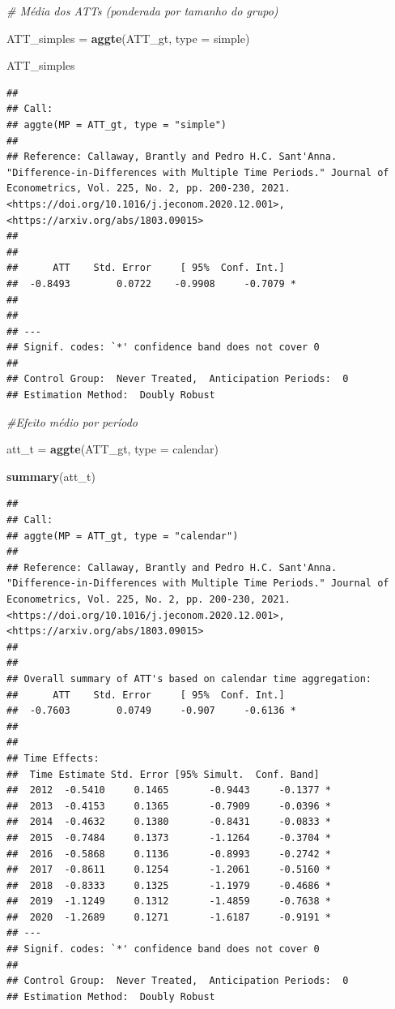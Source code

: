 \documentclass[
]{article}
\newenvironment{Shaded}{\begin{snugshade}}{\end{snugshade}}
\newcommand{\AttributeTok}[1]{\textcolor[rgb]{0.13,0.29,0.53}{#1}}
\newcommand{\CommentTok}[1]{\textcolor[rgb]{0.56,0.35,0.01}{\textit{#1}}}
\newcommand{\FunctionTok}[1]{\textcolor[rgb]{0.13,0.29,0.53}{\textbf{#1}}}
\newcommand{\NormalTok}[1]{#1}
\newcommand{\OtherTok}[1]{\textcolor[rgb]{0.56,0.35,0.01}{#1}}
\newcommand{\StringTok}[1]{\textcolor[rgb]{0.31,0.60,0.02}{#1}}
\begin{document}
\begin{Shaded}
\begin{Highlighting}[]
\CommentTok{\# Média dos ATTs (ponderada por tamanho do grupo)}

\NormalTok{ATT\_simples }\OtherTok{=} \FunctionTok{aggte}\NormalTok{(ATT\_gt, }\AttributeTok{type =} \StringTok{\textquotesingle{}simple\textquotesingle{}}\NormalTok{)}

\NormalTok{ATT\_simples}
\end{Highlighting}
\end{Shaded}

\begin{verbatim}
## 
## Call:
## aggte(MP = ATT_gt, type = "simple")
## 
## Reference: Callaway, Brantly and Pedro H.C. Sant'Anna.  "Difference-in-Differences with Multiple Time Periods." Journal of Econometrics, Vol. 225, No. 2, pp. 200-230, 2021. <https://doi.org/10.1016/j.jeconom.2020.12.001>, <https://arxiv.org/abs/1803.09015> 
## 
## 
##      ATT    Std. Error     [ 95%  Conf. Int.]  
##  -0.8493        0.0722    -0.9908     -0.7079 *
## 
## 
## ---
## Signif. codes: `*' confidence band does not cover 0
## 
## Control Group:  Never Treated,  Anticipation Periods:  0
## Estimation Method:  Doubly Robust
\end{verbatim}

\begin{Shaded}
\begin{Highlighting}[]
\CommentTok{\#Efeito médio por período}

\NormalTok{att\_t }\OtherTok{=} \FunctionTok{aggte}\NormalTok{(ATT\_gt, }\AttributeTok{type =} \StringTok{\textquotesingle{}calendar\textquotesingle{}}\NormalTok{)}

\FunctionTok{summary}\NormalTok{(att\_t)}
\end{Highlighting}
\end{Shaded}

\begin{verbatim}
## 
## Call:
## aggte(MP = ATT_gt, type = "calendar")
## 
## Reference: Callaway, Brantly and Pedro H.C. Sant'Anna.  "Difference-in-Differences with Multiple Time Periods." Journal of Econometrics, Vol. 225, No. 2, pp. 200-230, 2021. <https://doi.org/10.1016/j.jeconom.2020.12.001>, <https://arxiv.org/abs/1803.09015> 
## 
## 
## Overall summary of ATT's based on calendar time aggregation:  
##      ATT    Std. Error     [ 95%  Conf. Int.]  
##  -0.7603        0.0749     -0.907     -0.6136 *
## 
## 
## Time Effects:
##  Time Estimate Std. Error [95% Simult.  Conf. Band]  
##  2012  -0.5410     0.1465       -0.9443     -0.1377 *
##  2013  -0.4153     0.1365       -0.7909     -0.0396 *
##  2014  -0.4632     0.1380       -0.8431     -0.0833 *
##  2015  -0.7484     0.1373       -1.1264     -0.3704 *
##  2016  -0.5868     0.1136       -0.8993     -0.2742 *
##  2017  -0.8611     0.1254       -1.2061     -0.5160 *
##  2018  -0.8333     0.1325       -1.1979     -0.4686 *
##  2019  -1.1249     0.1312       -1.4859     -0.7638 *
##  2020  -1.2689     0.1271       -1.6187     -0.9191 *
## ---
## Signif. codes: `*' confidence band does not cover 0
## 
## Control Group:  Never Treated,  Anticipation Periods:  0
## Estimation Method:  Doubly Robust
\end{verbatim}
\end{document}
